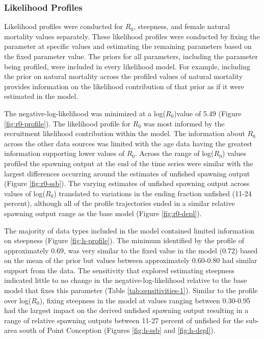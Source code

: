 \documentclass[11pt,
  english,
  letterpaper,
]{article}
\begin{document}
\hypertarget{likelihood-profiles}{%
\subsubsection{Likelihood Profiles}\label{likelihood-profiles}}

Likelihood profiles were conducted for \(R_0\), steepness, and female natural mortality values separately. These likelihood profiles were conducted by fixing the parameter at specific values and estimating the remaining parameters based on the fixed parameter value. The priors for all parameters, including the parameter being profiled, were included in every likelihood model. For example, including the prior on natural mortality across the profiled values of natural mortality provides information on the likelihood contribution of that prior as if it were estimated in the model.

The negative-log-likelihood was minimized at a log(\(R_0\))value of 5.49 (Figure \ref{fig:r0-profile}). The likelihood profile for \(R_0\) was most informed by the recruitment likelihood contribution within the model. The information about \(R_0\) across the other data sources was limited with the age data having the greatest information supporting lower values of \(R_0\). Across the range of log(\(R_0\)) values profiled the spawning output at the end of the time series were similar with the largest differences occurring around the estimates of unfished spawning output (Figure \ref{fig:r0-ssb}). The varying estimates of unfished spawning output across values of log(\(R_0\)) translated to variations in the ending fraction unfished (11-24 percent), although all of the profile trajectories ended in a similar relative spawning output range as the base model (Figure \ref{fig:r0-depl}).

The majority of data types included in the model contained limited information on steepness (Figure \ref{fig:h-profile}). The minimum identified by the profile of approximately 0.69, was very similar to the fixed value in the model (0.72) based on the mean of the prior but values between approximately 0.60-0.80 had similar support from the data. The sensitivity that explored estimating steepness indicated little to no change in the negative-log-likelihood relative to the base model that fixes this parameter (Table \ref{tab:sensitivities-1}). Similar to the profile over log(\(R_0\)), fixing steepness in the model at values ranging between 0.30-0.95 had the largest impact on the derived unfished spawning output resulting in a range of relative spawning outputs between 11-27 percent of unfished for the sub-area south of Point Conception (Figures \ref{fig:h-ssb} and \ref{fig:h-depl}).
\end{document}
